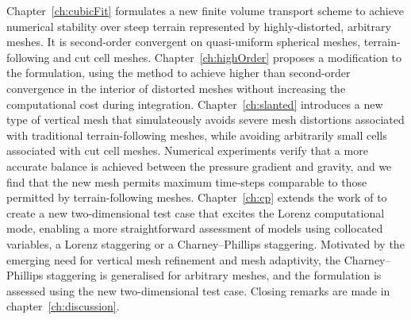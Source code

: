 Chapter~\ref{ch:cubicFit} formulates a new finite volume transport scheme to achieve numerical stability over steep terrain represented by highly-distorted, arbitrary meshes.
It is second-order convergent on quasi-uniform spherical meshes, terrain-following and cut cell meshes.
Chapter~\ref{ch:highOrder} proposes a modification to the formulation, using the \kexact{} method \citep{barth1995} to achieve higher than second-order convergence in the interior of distorted meshes without increasing the computational cost during integration.
Chapter~\ref{ch:slanted} introduces a new type of vertical mesh that simulateously avoids severe mesh distortions associated with traditional terrain-following meshes, while avoiding arbitrarily small cells associated with cut cell meshes.
Numerical experiments verify that a more accurate balance is achieved between the pressure gradient and gravity, and we find that the new mesh permits maximum time-steps comparable to those permitted by terrain-following meshes.
Chapter~\ref{ch:cp} extends the work of \citep{arakawa-konor1996} to create a new two-dimensional test case that excites the Lorenz computational mode, enabling a more straightforward assessment of models using collocated variables, a Lorenz staggering or a Charney--Phillips staggering.
Motivated by the emerging need for vertical mesh refinement and mesh adaptivity, the Charney--Phillips staggering is generalised for arbitrary meshes, and the formulation is assessed using the new two-dimensional test case.
Closing remarks are made in chapter~\ref{ch:discussion}.

